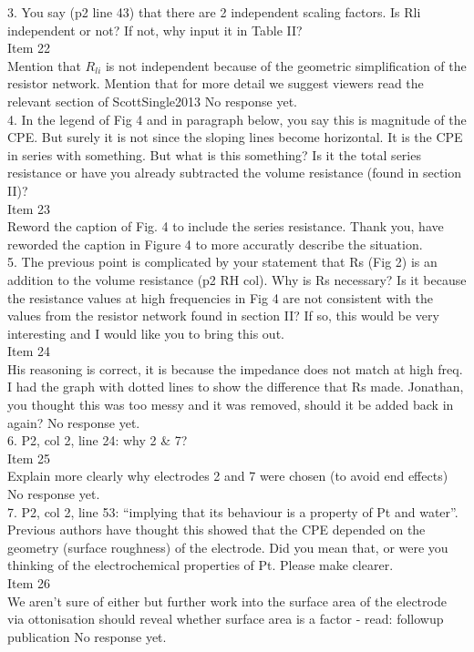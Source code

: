 \documentclass[journal, a4paper]{IEEEtran}
\begin{document}
{{3. You say (p2 line 43) that there are 2 independent scaling factors. Is Rli independent or not? If not, why input it in Table II?\\
{\color{OliveGreen}
    Item 22\\
    {\color{Red} Mention that $R_{li}$ is not independent because of the geometric simplification of the resistor network. Mention that for more detail we suggest viewers read the relevant section of ScottSingle2013}
    No response yet.
}\\

4. In the legend of Fig 4 and in paragraph below, you say this is magnitude of the CPE. But surely it is not since the sloping lines become horizontal. It is the CPE in series with something. But what is this something? Is it the total series resistance or have you already subtracted the volume resistance (found in section II)?\\
{\color{OliveGreen}
    Item 23\\
    {\color{Red} Reword the caption of Fig. 4 to include the series resistance.}
    Thank you, have reworded the caption in Figure 4 to more accuratly describe the situation.
}\\

5. The previous point is complicated by your statement that Rs (Fig 2) is an addition to the volume resistance (p2 RH col). Why is Rs necessary? Is it because the resistance values at high frequencies in Fig 4 are not consistent with the values from the resistor network found in section II? If so, this would be very interesting and I would like you to bring this out.\\
{\color{OliveGreen} 
    Item 24\\
    {\color{Red} His reasoning is correct, it is because the impedance does not match at high freq. I had the graph with dotted lines to show the difference that Rs made. Jonathan, you thought this was too messy and it was removed, should it be added back in again?}
    No response yet.
}\\

6. P2, col 2, line 24: why 2 & 7?\\
{\color{OliveGreen}
    Item 25\\
    {\color{Red} Explain more clearly why electrodes 2 and 7 were chosen (to avoid end effects)}
    No response yet.
}\\

7. P2, col 2, line 53: ``implying that its behaviour is a property of Pt and water''. Previous authors have thought this showed that the CPE depended on the geometry (surface roughness) of the electrode. Did you mean that, or were you thinking of the electrochemical properties of Pt. Please make clearer.\\
{\color{OliveGreen}
    Item 26\\
    {\color{Red} We aren't sure of either but further work into the surface area of the electrode via ottonisation should reveal whether surface area is a factor - read: followup publication}
    No response yet.
}\\

}}
\end{document}

